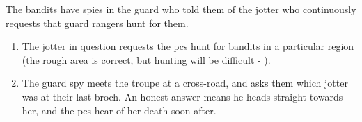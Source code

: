 \begin{multicols}{2}
\begin{dlist}
  The bandits have spies in the \gls{guard} who told them of the \gls{jotter} who continuously requests that \gls{guard} rangers hunt for them.
  \begin{enumerate}
    \item
    The \gls{jotter} in question requests the \glspl{pc} hunt for bandits in a particular region (the rough area is correct, but hunting will be difficult - \tn[14]).
    \item
    The \gls{guard} spy meets the troupe at a cross-road, and asks them which \gls{jotter} was at their last \gls{broch}.
    An honest answer means he heads straight towards her, and the \glspl{pc} hear of her death soon after.
  \end{enumerate}
\end{dlist}

\end{multicols}

\section{}
\label{lich}


